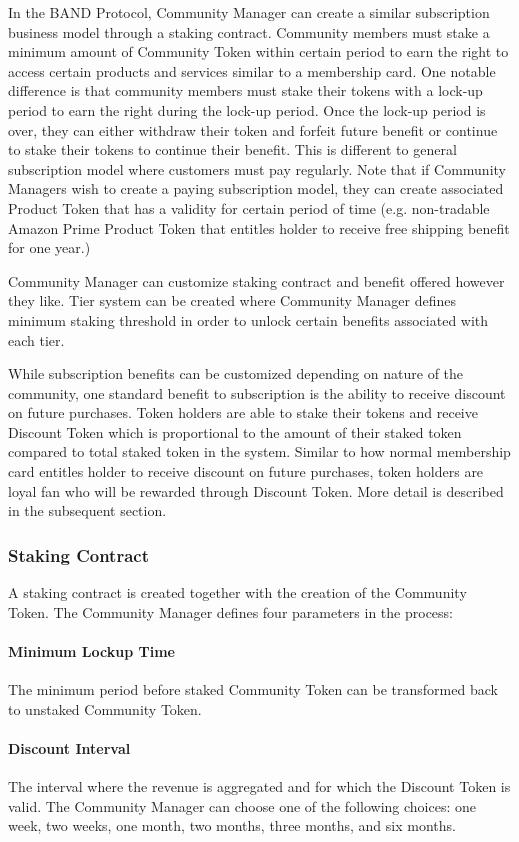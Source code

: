 \documentclass[letterpaper,11pt]{article}
\begin{document}
In the BAND Protocol, Community Manager can create a similar subscription business model through a staking contract. Community members must stake a minimum amount of Community Token within certain period to earn the right to access certain products and services similar to a membership card. One notable difference is that community members must stake their tokens with a lock-up period to earn the right during the lock-up period. Once the lock-up period is over, they can either withdraw their token and forfeit future benefit or continue to stake their tokens to continue their benefit. This is different to general subscription model where customers must pay regularly. Note that if Community Managers wish to create a paying subscription model, they can create associated Product Token that has a validity for certain period of time (e.g. non-tradable Amazon Prime Product Token that entitles holder to receive free shipping benefit for one year.)

Community Manager can customize staking contract and benefit offered however they like. Tier system can be created where Community Manager defines minimum staking threshold in order to unlock certain benefits associated with each tier.

While subscription benefits can be customized depending on nature of the community, one standard benefit to subscription is the ability to receive discount on future purchases. Token holders are able to stake their tokens and receive Discount Token which is proportional to the amount of their staked token compared to total staked token in the system. Similar to how normal membership card entitles holder to receive discount on future purchases, token holders are loyal fan who will be rewarded through Discount Token. More detail is described in the subsequent section.

\subsubsection{Staking Contract}
A staking contract is created together with the creation of the Community Token. The Community Manager defines four parameters in the process:
\paragraph{Minimum Lockup Time} The minimum period before staked Community Token can be transformed back to unstaked Community Token.
\paragraph{Discount Interval} The interval where the revenue is aggregated and for which the Discount Token is valid. The Community Manager can choose one of the following choices: one week, two weeks, one month, two months, three months, and six months.
\end{document}
